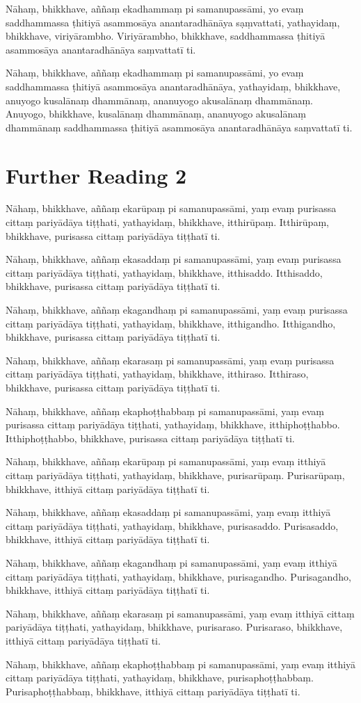 Nāhaṃ, bhikkhave, aññaṃ ekadhammaṃ pi samanupassāmi, yo evaṃ saddhammassa ṭhitiyā asammosāya anantaradhānāya sạṃvattati, yathayidaṃ, bhikkhave, viriyārambho. Viriyārambho, bhikkhave, saddhammassa ṭhitiyā asammosāya anantaradhānāya saṃvattatī ti.

Nāhaṃ, bhikkhave, aññaṃ ekadhammaṃ pi samanupassāmi, yo evaṃ saddhammassa ṭhitiyā asammosāya anantaradhānāya, yathayidaṃ, bhikkhave, anuyogo kusalānaṃ dhammānaṃ, ananuyogo akusalānaṃ dhammānaṃ. Anuyogo, bhikkhave, kusalānaṃ dhammānaṃ, ananuyogo akusalānaṃ dhammānaṃ saddhammassa ṭhitiyā asammosāya anantaradhānāya saṃvattatī ti.

\section*{Further Reading 2}

Nāhaṃ, bhikkhave, aññaṃ ekarūpaṃ pi samanupassāmi, yaṃ evaṃ purisassa cittaṃ pariyādāya tiṭṭhati, yathayidaṃ, bhikkhave, itthirūpaṃ. Itthirūpaṃ, bhikkhave, purisassa cittaṃ pariyādāya tiṭṭhatī ti.

Nāhaṃ, bhikkhave, aññaṃ ekasaddaṃ pi samanupassāmi, yaṃ evaṃ purisassa cittaṃ pariyādāya tiṭṭhati, yathayidaṃ, bhikkhave, itthisaddo. Itthisaddo, bhikkhave, purisassa cittaṃ pariyādāya tiṭṭhatī ti.

Nāhaṃ, bhikkhave, aññaṃ ekagandhaṃ pi samanupassāmi, yaṃ evaṃ purisassa cittaṃ pariyādāya tiṭṭhati, yathayidaṃ, bhikkhave, itthigandho. Itthigandho, bhikkhave, purisassa cittaṃ pariyādāya tiṭṭhatī ti.

Nāhaṃ, bhikkhave, aññaṃ ekarasaṃ pi samanupassāmi, yaṃ evaṃ purisassa cittaṃ pariyādāya tiṭṭhati, yathayidaṃ, bhikkhave, itthiraso. Itthiraso, bhikkhave, purisassa cittaṃ pariyādāya tiṭṭhatī ti.

Nāhaṃ, bhikkhave, aññaṃ ekaphoṭṭhabbaṃ pi samanupassāmi, yaṃ evaṃ purisassa cittaṃ pariyādāya tiṭṭhati, yathayidaṃ, bhikkhave, itthiphoṭṭhabbo. Itthiphoṭṭhabbo, bhikkhave, purisassa cittaṃ pariyādāya tiṭṭhatī ti.

Nāhaṃ, bhikkhave, aññaṃ ekarūpaṃ pi samanupassāmi, yaṃ evaṃ itthiyā cittaṃ pariyādāya tiṭṭhati, yathayidaṃ, bhikkhave, purisarūpaṃ. Purisarūpaṃ, bhikkhave, itthiyā cittaṃ pariyādāya tiṭṭhatī ti.

Nāhaṃ, bhikkhave, aññaṃ ekasaddaṃ pi samanupassāmi, yaṃ evaṃ itthiyā cittaṃ pariyādāya tiṭṭhati, yathayidaṃ, bhikkhave, purisasaddo. Purisasaddo, bhikkhave, itthiyā cittaṃ pariyādāya tiṭṭhatī ti.

Nāhaṃ, bhikkhave, aññaṃ ekagandhaṃ pi samanupassāmi, yaṃ evaṃ itthiyā cittaṃ pariyādāya tiṭṭhati, yathayidaṃ, bhikkhave, purisagandho. Purisagandho, bhikkhave, itthiyā cittaṃ pariyādāya tiṭṭhatī ti.

Nāhaṃ, bhikkhave, aññaṃ ekarasaṃ pi samanupassāmi, yaṃ evaṃ itthiyā cittaṃ pariyādāya tiṭṭhati, yathayidaṃ, bhikkhave, purisaraso. Purisaraso, bhikkhave, itthiyā cittaṃ pariyādāya tiṭṭhatī ti.

Nāhaṃ, bhikkhave, aññaṃ ekaphoṭṭhabbaṃ pi samanupassāmi, yaṃ evaṃ itthiyā cittaṃ pariyādāya tiṭṭhati, yathayidaṃ, bhikkhave, purisaphoṭṭhabbaṃ. Purisaphoṭṭhabbaṃ, bhikkhave, itthiyā cittaṃ pariyādāya tiṭṭhatī ti.